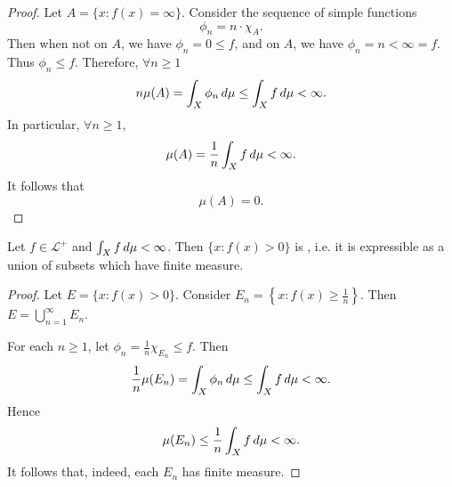 \documentclass[notoc,notitlepage]{tufte-book}
\begin{document}
\begin{proof}
  Let $A = \{ x : f(x) = \infty \}$.
  Consider the sequence of simple functions
  \begin{equation*}
    \phi_n = n \cdot \chi_A.
  \end{equation*}
  Then when not on $A$, we have $\phi_n = 0 \leq f$,
  and on $A$, we have $\phi_n = n < \infty = f$.
  Thus $\phi_n \leq f$.
  Therefore, $\forall n \geq 1$
  \begin{equation*}
    n \mu(A) = \int_{X} \phi_n \mathop{}\!d{\mu} \leq \int_{X} f \mathop{}\!d{\mu} < \infty.
  \end{equation*}
  In particular, $\forall n \geq 1$,
  \begin{equation*}
    \mu(A) = \frac{1}{n} \int_{X} f \mathop{}\!d{\mu} < \infty.
  \end{equation*}
  It follows that
  \begin{equation*}
    \mu(A) = 0.
  \end{equation*}
\end{proof}

\begin{propo}\label{propo:set_where_the_integrable_function_is_strictly_positive_is_sigma_finite}
  Let $f \in \mathcal{L}^+$ and $\int_{X} f \mathop{}\!d{\mu} < \infty$.
  Then $\{ x : f(x) > 0 \}$ is ,
  i.e. it is expressible as a union of subsets which have finite measure.
\end{propo}

\begin{proof}
  Let $E = \{ x : f(x) > 0 \}$.
  Consider $E_n = \left\{ x : f(x) \geq \frac{1}{n} \right\}$.
  Then $E = \bigcup_{n=1}^{\infty} E_n$.

  For each $n \geq 1$, let $\phi_n = \frac{1}{n} \chi_{E_n} \leq f$.
  Then
  \begin{equation*}
    \frac{1}{n} \mu(E_n)
    = \int_{X} \phi_n \mathop{}\!d{\mu}
    \leq \int_{X} f \mathop{}\!d{\mu} < \infty.
  \end{equation*}
  Hence
  \begin{equation*}
    \mu(E_n) \leq \frac{1}{n} \int_{X} f \mathop{}\!d{\mu} < \infty.
  \end{equation*}
  It follows that, indeed, each $E_n$ has finite measure.
\end{proof}
\end{document}
